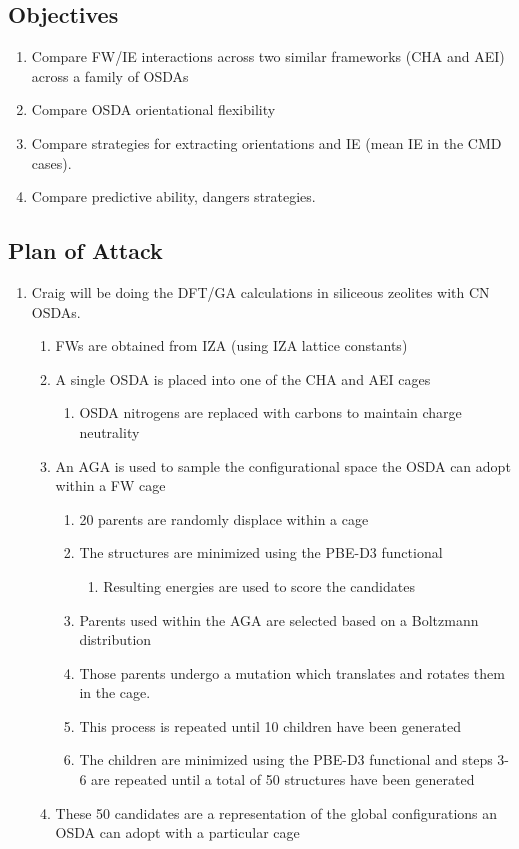 \documentclass[journal=accacs,manuscript=article, email=true, layout=traditional]{achemso}
\begin{document}
\subsection{Objectives}
\label{sec:org3c4d1c4}

\begin{enumerate}
\item Compare FW/IE interactions across two similar frameworks (CHA and AEI) across a family of OSDAs
\item Compare OSDA orientational flexibility
\item Compare strategies for extracting orientations and IE (mean IE in the CMD cases).
\item Compare predictive ability, dangers strategies.
\end{enumerate}

\subsection{Plan of Attack}
\label{sec:org7a4031c}

\begin{enumerate}
\item Craig will be doing the DFT/GA calculations in siliceous zeolites with CN OSDAs.
\begin{enumerate}
\item FWs are obtained from IZA (using IZA lattice constants)
\item A single OSDA is placed into one of the CHA and AEI cages
\begin{enumerate}
\item OSDA nitrogens are replaced with carbons to maintain charge neutrality
\end{enumerate}
\item An AGA is used to sample the configurational space the OSDA can adopt within a FW cage
\begin{enumerate}
\item 20 parents are randomly displace within a cage
\item The structures are minimized using the PBE-D3 functional
\begin{enumerate}
\item Resulting energies are used to score the candidates
\end{enumerate}
\item Parents used within the AGA are selected based on a Boltzmann distribution
\item Those parents undergo a mutation which translates and rotates them in the cage.
\item This process is repeated until 10 children have been generated
\item The children are minimized using the PBE-D3 functional and steps 3-6 are repeated until a total of 50 structures have been generated
\end{enumerate}
\item These 50 candidates are a representation of the global configurations an OSDA can adopt with a particular cage
\end{enumerate}
\end{enumerate}
\end{document}
